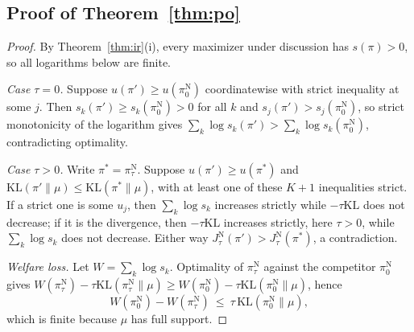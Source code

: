 \documentclass[letterpaper]{article} %
\newcommand{\KL}{\mathrm{KL}}
\begin{document}
\subsection{Proof of Theorem~\ref{thm:po}}
\begin{proof}
By Theorem~\ref{thm:ir}(i), every maximizer under discussion has $s(\pi)>0$, so all logarithms below are finite.

\emph{Case $\tau=0$.} Suppose $u(\pi')\ge u(\pi^{\mathrm N}_0)$ coordinatewise with strict inequality at some $j$. Then $s_k(\pi')\ge s_k(\pi^{\mathrm N}_0)>0$ for all $k$ and $s_j(\pi')>s_j(\pi^{\mathrm N}_0)$, so strict monotonicity of the logarithm gives $\sum_k\log s_k(\pi')>\sum_k\log s_k(\pi^{\mathrm N}_0)$, contradicting optimality.

\emph{Case $\tau>0$.} Write $\pi^\ast=\pi^{\mathrm N}_\tau$. Suppose $u(\pi')\ge u(\pi^\ast)$ and $\KL(\pi'\|\mu)\le\KL(\pi^\ast\|\mu)$, with at least one of these $K+1$ inequalities strict. If a strict one is some $u_j$, then $\sum_k\log s_k$ increases strictly while $-\tau\KL$ does not decrease; if it is the divergence, then $-\tau\KL$ increases strictly, here $\tau>0$, while $\sum_k\log s_k$ does not decrease. Either way $J^{\mathrm N}_\tau(\pi')>J^{\mathrm N}_\tau(\pi^\ast)$, a contradiction.

\emph{Welfare loss.} Let $W=\sum_k\log s_k$. Optimality of $\pi^{\mathrm N}_\tau$ against the competitor $\pi^{\mathrm N}_0$ gives $W(\pi^{\mathrm N}_\tau)-\tau\KL(\pi^{\mathrm N}_\tau\|\mu)\ge W(\pi^{\mathrm N}_0)-\tau\KL(\pi^{\mathrm N}_0\|\mu)$, hence
\[
W(\pi^{\mathrm N}_0)-W(\pi^{\mathrm N}_\tau)\ \le\ \tau\,\KL(\pi^{\mathrm N}_0\|\mu),
\]
which is finite because $\mu$ has full support.
\end{proof}
\end{document}
